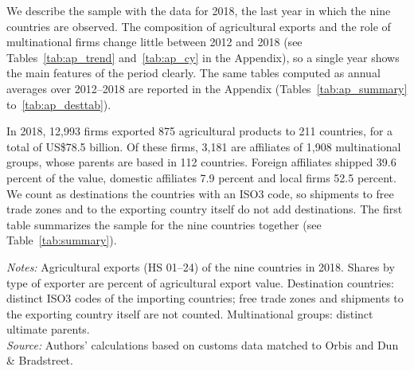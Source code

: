 \documentclass[11pt,a4paper]{article}
\newcommand{\srcnote}{\textit{Source:} Authors' calculations based on customs data matched to Orbis and Dun \& Bradstreet.}
\begin{document}
We describe the sample with the data for 2018, the last year in which the nine countries are
observed. The composition of agricultural exports and the role of multinational firms change little
between 2012 and 2018 (see Tables~\ref{tab:ap_trend} and~\ref{tab:ap_cy} in the Appendix), so a
single year shows the main features of the period clearly. The same tables computed as annual
averages over 2012--2018 are reported in the Appendix (Tables~\ref{tab:ap_summary}
to~\ref{tab:ap_desttab}).

In 2018, 12,993 firms exported 875 agricultural products to 211 countries, for a total of US\$78.5
billion. Of these firms, 3,181 are affiliates of 1,908 multinational groups, whose parents are
based in 112 countries. Foreign affiliates shipped 39.6 percent of the value, domestic affiliates
7.9 percent and local firms 52.5 percent. We count as destinations the countries with an ISO3 code,
so shipments to free trade zones and to the exporting country itself do not add destinations. The
first table summarizes the sample for the nine countries together (see Table~\ref{tab:summary}).
\begin{table}[H]\centering\small%
  \caption{Agricultural Sample Summary, 2018}%
  \label{tab:summary}%
  \par\vspace{3pt}%
  \begin{minipage}{0.95\textwidth}\footnotesize %
  \textit{Notes:} Agricultural exports (HS 01--24) of the nine countries in 2018. Shares by type of exporter are percent of agricultural export value. Destination countries: distinct ISO3 codes of the importing countries; free trade zones and shipments to the exporting country itself are not counted. Multinational groups: distinct ultimate parents.\\[3pt]%
  \srcnote%
  \end{minipage}%
  \end{table}
\end{document}
